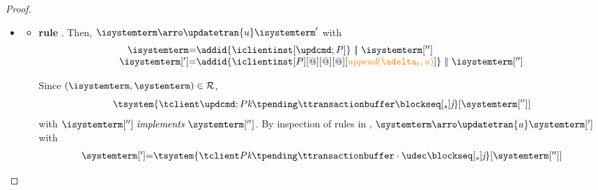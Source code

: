 \begin{proof}

\begin{itemize}
   
	
   \item%
   
		
			
			\begin{itemize}
\item {\bf rule }. Then, $\isystemterm  \arroi{\updatetran{u}} \isystemterm '$ with 
				\[\begin{array}{r@{=}l}
					\isystemterm & \addid{\iclientinst[\tupdateins]} \ \bigpar \ \isystemterm['']
					\\
					\isystemterm['] & \addid{\iclientinst[P][@][@][@][\iappend{\transactionbuffer}{u}]} \ \bigpar \   \isystemterm['']	
				  \end{array}
				\]
				
				Since $(\isystemterm,\systemterm)\in \mathcal{R}$,
				\[ \tsystem{\tclienti{\tupdateins}{\tknown}{\tpending}{\ttransactionbuffer}{\tsent}{\treceivebuffer}}[{\systemterm['']}] \]
				with $\implements{\isystemterm['']}{\systemterm['']}$. By inspection of rules in \figref{}, 
				$\systemterm \arroi{\updatetran{u}} \systemterm[']$ with
				\[\begin{array}{r@{=}l}
						\systemterm['] & \tsystem{\tclienti{\tprogram}{\tknown}{\tpending}{\ttransactionbuffer \cdot \tupdate}{\tsent}{\treceivebuffer}}[{\systemterm['']}]	
				  \end{array}		
				\]
				

\end{itemize}
\end{itemize}
\end{proof}
